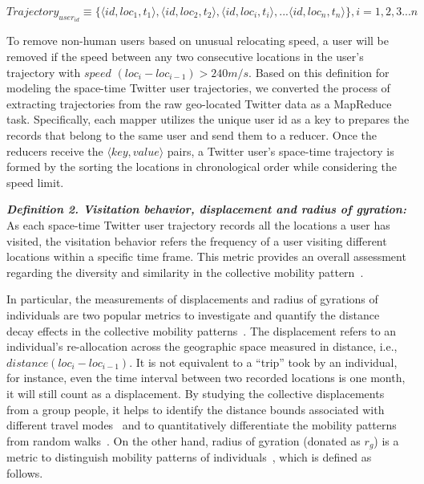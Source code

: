 \documentclass[ijgi,article,submit,moreauthors,pdftex,10pt,a4paper]{mdpi}
\theoremstyle{mdpi}
\newcounter{ex}
\newcounter{re}
\theoremstyle{mdpidefinition}
\begin{document}
$Trajectory_{user_{id}} \equiv \lbrace \langle id, loc_{1}, t_{1}\rangle, \langle id, loc_{2}, t_{2}\rangle, \langle id, loc_{i}, t_{i}\rangle, ... \langle id, loc_{n}, t_{n}\rangle \rbrace, i = 1, 2, 3...n$
\newline

To remove non-human users based on unusual relocating speed, a user will be removed if the speed between any two consecutive locations in the user's trajectory with $speed$ $(loc_{i} - loc_{i-1}) > 240 m/s $.
Based on this definition for modeling the space-time Twitter user trajectories, we converted the process of extracting trajectories from the raw geo-located Twitter data as a MapReduce task. Specifically, each mapper utilizes the unique user id as a key to prepares the records that belong to the same user and send them to a reducer. Once the reducers receive the $\langle key, value\rangle$ pairs, a Twitter user's space-time trajectory is formed by the sorting the locations in chronological order while considering the speed limit.
\newline

\noindent\emph{\textbf{Definition 2. Visitation behavior, displacement and radius of gyration:}} As each space-time Twitter user trajectory records all the locations a user has visited, the visitation behavior refers the frequency of a user visiting different locations within a specific time frame.
This metric provides an overall assessment regarding the diversity and similarity in the collective mobility pattern~\cite{gao2012exploring}.

In particular, the measurements of displacements and radius of gyrations of individuals are two popular metrics to investigate and quantify the distance decay effects in the collective mobility patterns~\cite{gonzalez2008understanding}.
The displacement refers to an individual's re-allocation across the geographic space measured in distance, i.e., $distance (loc_{i} - loc_{i-1})$.
It is not equivalent to a ``trip'' took by an individual, for instance, even the time interval between two recorded locations is one month, it will still count as a displacement.
By studying the collective displacements from a group people, it helps to identify the distance bounds associated with different travel modes~\cite{Jurdak2015} and to quantitatively differentiate the mobility patterns from random walks~\cite{brockmann2006scaling}.
On the other hand, radius of gyration (donated as $r_{g}$) is a metric to distinguish mobility patterns of individuals~\cite{gonzalez2008understanding}, which is defined as follows.
\newline
\end{document}

